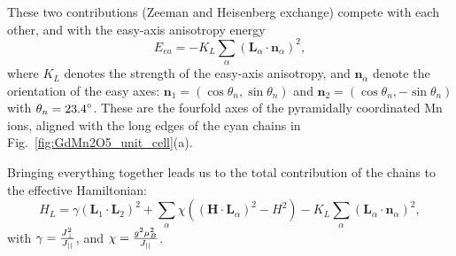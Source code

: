 These two contributions (Zeeman and Heisenberg exchange) compete with each other, and with the easy-axis anisotropy energy
\begin{equation}
	E_{ea} = -K_L\sum_\alpha(\bm{L}_\alpha\cdot \bm{n}_\alpha)^2,
\end{equation}
where $K_L$ denotes the strength of the easy-axis anisotropy, and $\bm n_\alpha$ denote the orientation of the easy axes:
$\bm{n}_1=\left(\cos\theta_n, \sin\theta_n\right)$ and $\bm{n}_2=\left(\cos\theta_n, -\sin\theta_n\right)$ with $\theta_n = \rm{23.4}^\circ$.
These are the fourfold axes of the pyramidally coordinated Mn ions, aligned with the long edges of the cyan chains in Fig.~\ref{fig:GdMn2O5_unit_cell}(a).

Bringing everything together leads us to the total contribution of the chains to the effective Hamiltonian:
\begin{equation}
	H_L = \gamma(\bm{L}_1\cdot \bm{L}_2)^2
    +\sum_{\alpha}\chi((\bm{H}\cdot \bm{L}_\alpha)^2-H^2)
    -K_L\sum_\alpha(\bm{L}_\alpha\cdot \bm{n}_\alpha)^2\label{eq:GdMn2O5_hami_1},
\end{equation}
with $\gamma = \frac{J_{\perp}^2}{J_{||}}$, and $\chi = \frac{g^2\mu_B^2}{J_{||}}$. 

